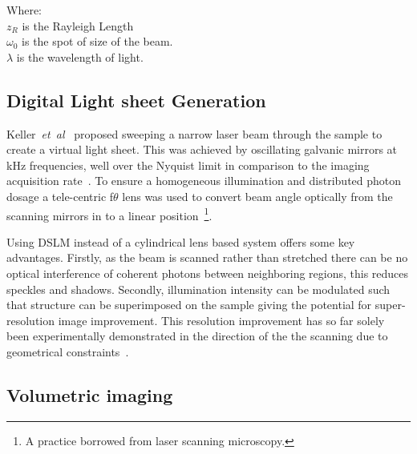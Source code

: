 Where:\\
$z_R$ is the Rayleigh Length\\
$\omega_0$ is the spot of size of the beam.\\
$\lambda$ is the wavelength of light.\\


\subsection{Digital Light sheet Generation}

Keller~\emph{et~al}~\cite{keller_quantitative_2008} proposed sweeping a narrow laser beam through the sample to create a virtual light sheet.
This was achieved by oscillating galvanic mirrors at kHz frequencies, well over the Nyquist limit in comparison to the imaging acquisition rate~\cite{keller_quantitative_2008}.
To ensure a homogeneous illumination and distributed photon dosage a tele-centric f$\theta$ lens was used to convert beam angle optically from the scanning mirrors in to a linear position~\footnote{A practice borrowed from laser scanning microscopy.}.

Using DSLM instead of a cylindrical lens based system offers some key advantages.
Firstly, as the beam is scanned rather than stretched there can be no optical interference of coherent photons between neighboring regions, this reduces speckles and shadows.
Secondly, illumination intensity can be modulated such that structure can be superimposed on the sample giving the potential for super-resolution image improvement.
This resolution improvement has so far solely been experimentally demonstrated in the direction of the the scanning due to geometrical constraints~\cite{chen_lattice_2014}.

\subsection{Volumetric imaging}

